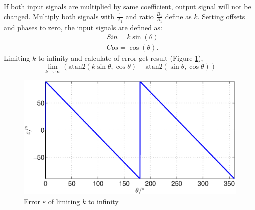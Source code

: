 \documentclass[a4paper]{article}
\begin{document}
If both input signals are multiplied by same coefficient, output signal will not  be changed. Multiply both signals with $\frac{1}{A_1}$ and ratio $\frac{B_1}{A_1}$ define as $k$. Setting offsets and phases to zero, the input signals are defined as:
	\begin{eqnarray}
	\label{equ:def_sin_ama}
	&Sin = k \sin(\theta)\\
	\label{equ:def_cos_amp}
	&Cos =\cos(\theta).
	\end{eqnarray}
Limiting $k$ to infinity and calculate of error get result (Figure \ref{fig:lim_amp}),
\begin{equation}
\label{equ:amp_lim}
\lim_{k \rightarrow \infty} (\mathrm{atan2}(k \sin{\theta},\cos{\theta})-\mathrm{atan2}(\sin{\theta},\cos{\theta}))
\end{equation}
\begin{figure}[!htb]
	\begin{center}
		\includegraphics[width=\linewidth]{./Slike/lim_amp.eps}
		\caption{Error $\varepsilon$ of limiting $k$ to infinity} \label{fig:lim_amp}
	\end{center}
\end{figure}
\end{document}
